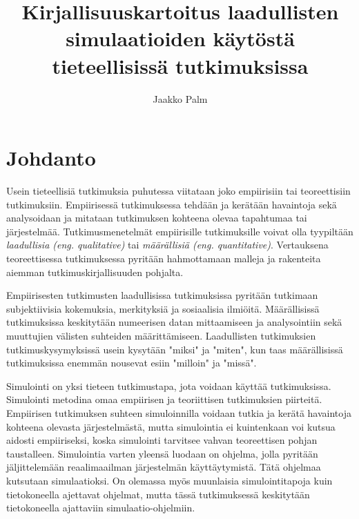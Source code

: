 \documentclass[utf8]{gradu3}
\begin{document}
\title{Kirjallisuuskartoitus laadullisten simulaatioiden käytöstä tieteellisissä tutkimuksissa}
\abstract{%
  
}

\author{Jaakko Palm}

\maketitle

\mainmatter

\chapter{Johdanto} \label{johdanto}
Usein tieteellisiä tutkimuksia puhutessa viitataan joko empiirisiin 
tai teoreettisiin tutkimuksiin. Empiirisessä tutkimuksessa tehdään 
ja kerätään havaintoja sekä analysoidaan 
ja mitataan tutkimuksen kohteena olevaa tapahtumaa tai järjestelmää. 
Tutkimusmenetelmät empiirisille tutkimuksille voivat olla 
tyypiltään \textit{laadullisia (eng. qualitative)} 
tai \textit{määrällisiä (eng. quantitative)}. 
Vertauksena teoreettisessa tutkimuksessa pyritään hahmottamaan 
malleja ja rakenteita aiemman tutkimuskirjallisuuden pohjalta. 

Empiirisesten tutkimusten laadullisissa tutkimuksissa pyritään tutkimaan subjektiivisia kokemuksia, merkityksiä ja sosiaalisia ilmiöitä. Määrällisissä tutkimuksissa keskitytään
numeerisen datan mittaamiseen ja analysointiin sekä muuttujien välisten suhteiden määrittämiseen. 
Laadullisten tutkimuksien tutkimuskysymyksissä usein kysytään "miksi" ja "miten", 
kun taas määrällisissä tutkimuksissa enemmän nousevat esiin "milloin" ja "missä".

Simulointi on yksi tieteen tutkimustapa, jota voidaan käyttää tutkimuksissa.
Simulointi metodina omaa empiirisen ja teoriittisen tutkimuksien piirteitä.
Empiirisen tutkimuksen suhteen simuloinnilla voidaan tutkia ja kerätä havaintoja
kohteena olevasta järjestelmästä, mutta simulointia ei 
kuintenkaan voi kutsua aidosti empiiriseksi,
koska simulointi tarvitsee vahvan teoreettisen pohjan taustalleen.
Simulointia varten yleensä luodaan on ohjelma, 
jolla pyritään jäljittelemään reaalimaailman järjestelmän käyttäytymistä.
Tätä ohjelmaa kutsutaan simulaatioksi.
On olemassa myös muunlaisia simulointitapoja kuin tietokoneella ajettavat ohjelmat, mutta 
tässä tutkimuksessä keskitytään tietokoneella ajattaviin simulaatio-ohjelmiin.
\end{document}
